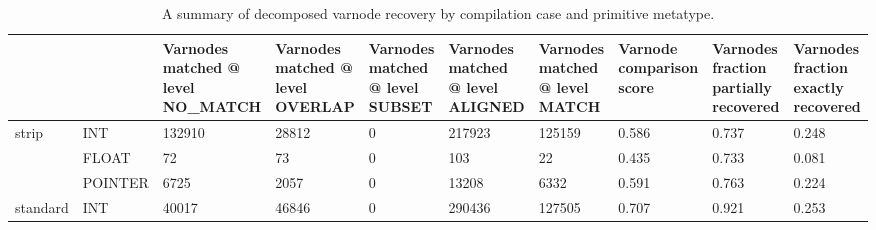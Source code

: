 \begin{table*}[tb]
\centering
\caption{A summary of decomposed varnode recovery by compilation case and primitive metatype.}
\label{table:opts-varnodes-summary-metatypes-decomposed}
\begin{tabular}{lp{1.50cm}p{1.50cm}p{1.33cm}p{1.33cm}p{1.33cm}p{1.33cm}p{1.33cm}p{1.33cm}p{1.33cm}}
\toprule
      &         & {Varnodes matched @ level NO\_MATCH} & {Varnodes matched @ level OVERLAP} & {Varnodes matched @ level SUBSET} & {Varnodes matched @ level ALIGNED} & {Varnodes matched @ level MATCH} & {Varnode comparison score} & {Varnodes fraction partially recovered} & {Varnodes fraction exactly recovered} \\
\midrule
\multirow{3}{*}{strip} & INT &                                             132910 &                                            28812 &                                               0 &                                           217923 &                                         125159 &                                    0.586 &                                              0.737 &                                              0.248 \\
      & FLOAT &                                                 72 &                                               73 &                                               0 &                                              103 &                                             22 &                                    0.435 &                                              0.733 &                                              0.081 \\
      & POINTER &                                               6725 &                                             2057 &                                               0 &                                            13208 &                                           6332 &                                    0.591 &                                              0.763 &                                              0.224 \\
\cline{1-10}
\multirow{3}{*}{standard} & INT &                                              40017 &                                            46846 &                                               0 &                                           290436 &                                         127505 &                                    0.707 &                                              0.921 &                                              0.253 \\

\end{tabular}
\end{table*}
